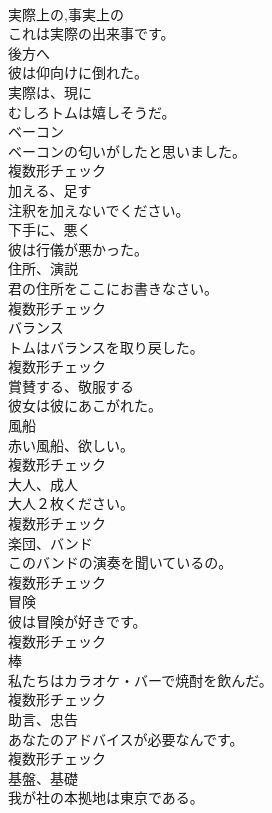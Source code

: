 \documentclass[8pt]{extreport}
\begin{document}
\begin{CJK}{UTF8}{min}
\\	[形容詞]	実際上の,事実上の	
\\	これは実際の出来事です。	
\\	[副詞]	後方へ	
\\	彼は仰向けに倒れた。	
\\	[副詞]	実際は、現に	
\\	むしろトムは嬉しそうだ。	
\\	[名詞]	ベーコン	
\\	ベーコンの匂いがしたと思いました。	
\\	複数形チェック
\\	[動詞]	加える、足す	
\\	注釈を加えないでください。	
\\	[副詞]	下手に、悪く	
\\	彼は行儀が悪かった。	
\\	[名詞]	住所、演説	
\\	君の住所をここにお書きなさい。	
\\	複数形チェック
\\	[名詞]	バランス	
\\	トムはバランスを取り戻した。	
\\	複数形チェック
\\	[動詞]	賞賛する、敬服する	
\\	彼女は彼にあこがれた。	
\\	[名詞]	風船	
\\	赤い風船、欲しい。	
\\	複数形チェック
\\	[名詞]	大人、成人	
\\	大人２枚ください。	
\\	複数形チェック
\\	[名詞]	楽団、バンド	
\\	このバンドの演奏を聞いているの。	
\\	複数形チェック
\\	[名詞]	冒険	
\\	彼は冒険が好きです。	
\\	複数形チェック
\\	[名詞]	棒	
\\	私たちはカラオケ・バーで焼酎を飲んだ。	
\\	複数形チェック
\\	[名詞]	助言、忠告	
\\	あなたのアドバイスが必要なんです。	
\\	複数形チェック
\\	[名詞]	基盤、基礎	
\\	我が社の本拠地は東京である。	

\end{CJK}
\end{document}
